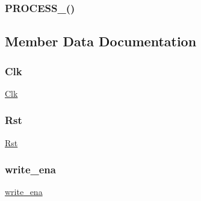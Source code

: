 \subsubsection{\texorpdfstring{P\+R\+O\+C\+E\+S\+S\+\_()}{PROCESS\_2()}}
{\footnotesize\ttfamily \hspace{0.3cm}}



\subsection{Member Data Documentation}
\mbox{\label{enumdp__ram1_a9734a0746c03551a6c7c98c0878cbe91}} 
\subsubsection{\texorpdfstring{Clk}{Clk}}
{\footnotesize\ttfamily \mbox{\hyperlink{enumdp__ram1_a9734a0746c03551a6c7c98c0878cbe91}{Clk}} {\bfseries \textcolor{vhdlchar}{ }} \hspace{0.3cm}}

\mbox{\label{enumdp__ram1_a8a83b4e0022e3e5f6037a77885ef1d16}} 
\subsubsection{\texorpdfstring{Rst}{Rst}}
{\footnotesize\ttfamily \mbox{\hyperlink{enumdp__ram1_a8a83b4e0022e3e5f6037a77885ef1d16}{Rst}} {\bfseries \textcolor{vhdlchar}{ }} \hspace{0.3cm}}

\mbox{\label{enumdp__ram1_a11db501a3142a738e6d633e3d983a1a6}} 
\subsubsection{\texorpdfstring{write\+\_\+ena}{write\_ena}}
{\footnotesize\ttfamily \mbox{\hyperlink{enumdp__ram1_a11db501a3142a738e6d633e3d983a1a6}{write\+\_\+ena}} {\bfseries \textcolor{vhdlchar}{ }} \hspace{0.3cm}}

